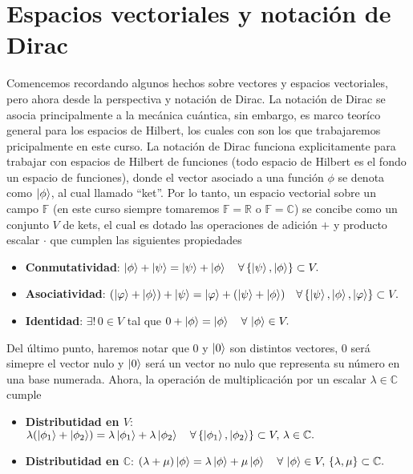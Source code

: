 \documentclass[letterpaper]{book}
\newcommand{\co}{\ensuremath{\mathbb C }}
\begin{document}
\section{Espacios vectoriales y notación de Dirac}

\noindent Comencemos recordando algunos hechos sobre vectores y espacios vectoriales, pero ahora desde la perspectiva y notación de Dirac. La notación de Dirac se asocia principalmente a la mecánica cuántica, sin embargo, es marco teoríco general para los espacios de Hilbert, los cuales con son los que trabajaremos pricipalmente en este curso. La notación de Dirac funciona explicitamente para trabajar con espacios de Hilbert de funciones (todo espacio de Hilbert es el fondo un espacio de funciones), donde el vector asociado a una función $\phi$ se denota como $\ket{\phi}$, al cual llamado ``ket''. Por lo tanto, un espacio vectorial sobre un campo \(\mathbb{F}\) (en este curso siempre tomaremos \(\mathbb{F} = \mathbb{R}\) o \(\mathbb{F} = \mathbb{C}\)) se concibe como un conjunto \(V\) de kets, el cual es dotado las operaciones de adición \(+\) y producto escalar \(\cdot\) que cumplen las siguientes propiedades

\begin{itemize}
    \item \textbf{Conmutatividad}: \(\ket{\phi} + \ket{\psi} = \ket{\psi} + \ket{\phi}\quad\forall\,\{\ket{\psi},\ket{\phi}\}\subset V.\)
    \item \textbf{Asociatividad}: \((\ket{\varphi}+\ket{\phi}) + \ket{\psi} = \ket{\varphi}+(\ket{\psi} + \ket{\phi})\quad\forall\,\{\ket{\psi},\ket{\phi},\ket{\varphi}\}\subset V.\)
    \item \textbf{Identidad}: \(\exists! \, 0 \in V\) tal que \(0 + \ket{\phi} = \ket{\phi}\quad\forall\,\ket{\phi}\in V.\)
\end{itemize}

Del último punto, haremos notar que $0$ y $\ket{0}$ son distintos vectores, $0$ será simepre el vector nulo y $\ket{0}$ será un vector no nulo que representa su número en una base numerada. Ahora, la operación de multiplicación por un escalar \(\lambda \in \co\) cumple

\begin{itemize}
    \item \textbf{Distributidad en \(V\)}: \(\lambda(\ket{\phi_1} + \ket{\phi_2}) = \lambda\ket{\phi_1} + \lambda\ket{\phi_2}\quad\forall\,\{\ket{\phi_1},\ket{\phi_2}\}\subset V,\,\lambda\in\co.\)
    \item \textbf{Distributidad en \(\co\)}: \((\lambda + \mu)\ket{\phi} = \lambda\ket{\phi} + \mu\ket{\phi}\quad\forall\,\ket{\phi}\in V,\,\{\lambda,\mu\}\subset\co.\)
\end{itemize}
\end{document}
